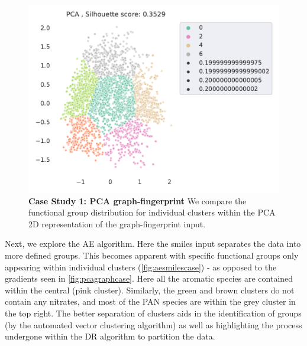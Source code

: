 \begin{figure}[H]
    \centering
    \includegraphics[width=\textwidth]{outputs/PCA/fingerprints_all.pdf}
    \caption{\textbf{Case Study 1: PCA graph-fingerprint} We compare the functional group distribution for individual clusters within the PCA 2D representation of the graph-fingerprint input.}
    \label{fig:pcagraphcase}
\end{figure}

\newpage

Next, we explore the AE algorithm. Here the smiles input separates the data into more defined groups. This becomes apparent with specific functional groups only appearing within individual clusters (\autoref{fig:aesmilescase}) - as opposed to the gradients seen in \autoref{fig:pcagraphcase}. Here all the aromatic species are contained within the central (pink cluster). Similarly, the green and brown clusters do not contain any nitrates, and most of the PAN species are within the grey cluster in the top right. The better separation of clusters aids in the identification of groups (by the automated vector clustering algorithm) as well as highlighting the process undergone within the DR algorithm to partition the data.






